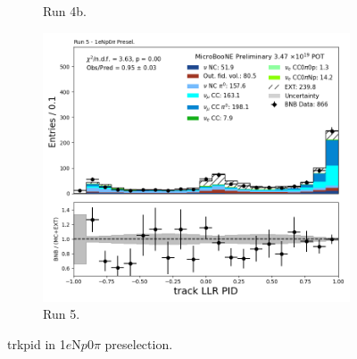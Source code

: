 \begin{figure}[H]
\begin{subfigure}[t]{0.32\linewidth}
        \caption{Run 4b.}
    \end{subfigure}%
    \hspace{0.2cm}%
    \begin{subfigure}[t]{0.32\linewidth}
        \includegraphics[width=\linewidth]{technote/Appendix_Preselection/Figures/1eNp0pi/Run5/trkpid_Run5_1eNp0pi_Presel.png}
        \caption{Run 5.}
    \end{subfigure}
    \caption{trkpid in 1$e$N$p$0$\pi$ preselection.}
\end{figure}

